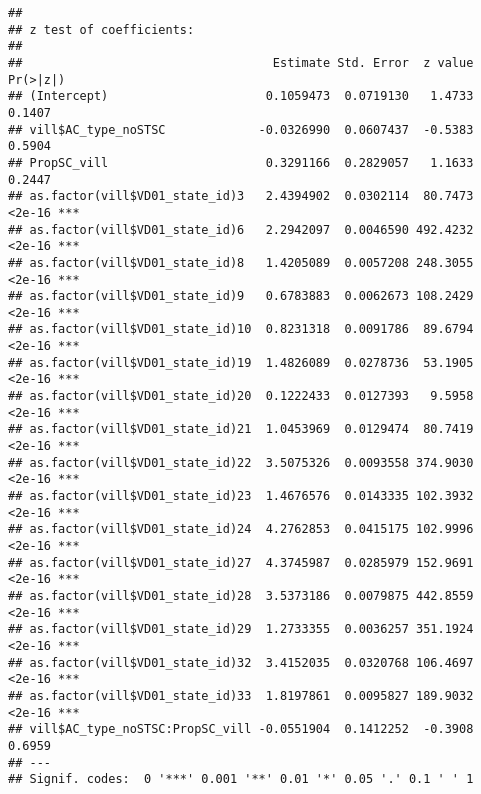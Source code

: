 \documentclass[
]{article}
\newenvironment{Shaded}{\begin{snugshade}}{\end{snugshade}}
\newcommand{\AttributeTok}[1]{\textcolor[rgb]{0.77,0.63,0.00}{#1}}
\newcommand{\FunctionTok}[1]{\textcolor[rgb]{0.00,0.00,0.00}{#1}}
\newcommand{\NormalTok}[1]{#1}
\newcommand{\OtherTok}[1]{\textcolor[rgb]{0.56,0.35,0.01}{#1}}
\newcommand{\SpecialCharTok}[1]{\textcolor[rgb]{0.00,0.00,0.00}{#1}}
\begin{document}
\begin{Shaded}
\end{Shaded}

\begin{verbatim}
## 
## z test of coefficients:
## 
##                                   Estimate Std. Error  z value Pr(>|z|)    
## (Intercept)                      0.1059473  0.0719130   1.4733   0.1407    
## vill$AC_type_noSTSC             -0.0326990  0.0607437  -0.5383   0.5904    
## PropSC_vill                      0.3291166  0.2829057   1.1633   0.2447    
## as.factor(vill$VD01_state_id)3   2.4394902  0.0302114  80.7473   <2e-16 ***
## as.factor(vill$VD01_state_id)6   2.2942097  0.0046590 492.4232   <2e-16 ***
## as.factor(vill$VD01_state_id)8   1.4205089  0.0057208 248.3055   <2e-16 ***
## as.factor(vill$VD01_state_id)9   0.6783883  0.0062673 108.2429   <2e-16 ***
## as.factor(vill$VD01_state_id)10  0.8231318  0.0091786  89.6794   <2e-16 ***
## as.factor(vill$VD01_state_id)19  1.4826089  0.0278736  53.1905   <2e-16 ***
## as.factor(vill$VD01_state_id)20  0.1222433  0.0127393   9.5958   <2e-16 ***
## as.factor(vill$VD01_state_id)21  1.0453969  0.0129474  80.7419   <2e-16 ***
## as.factor(vill$VD01_state_id)22  3.5075326  0.0093558 374.9030   <2e-16 ***
## as.factor(vill$VD01_state_id)23  1.4676576  0.0143335 102.3932   <2e-16 ***
## as.factor(vill$VD01_state_id)24  4.2762853  0.0415175 102.9996   <2e-16 ***
## as.factor(vill$VD01_state_id)27  4.3745987  0.0285979 152.9691   <2e-16 ***
## as.factor(vill$VD01_state_id)28  3.5373186  0.0079875 442.8559   <2e-16 ***
## as.factor(vill$VD01_state_id)29  1.2733355  0.0036257 351.1924   <2e-16 ***
## as.factor(vill$VD01_state_id)32  3.4152035  0.0320768 106.4697   <2e-16 ***
## as.factor(vill$VD01_state_id)33  1.8197861  0.0095827 189.9032   <2e-16 ***
## vill$AC_type_noSTSC:PropSC_vill -0.0551904  0.1412252  -0.3908   0.6959    
## ---
## Signif. codes:  0 '***' 0.001 '**' 0.01 '*' 0.05 '.' 0.1 ' ' 1
\end{verbatim}

\begin{Shaded}
\end{Shaded}
\end{document}
